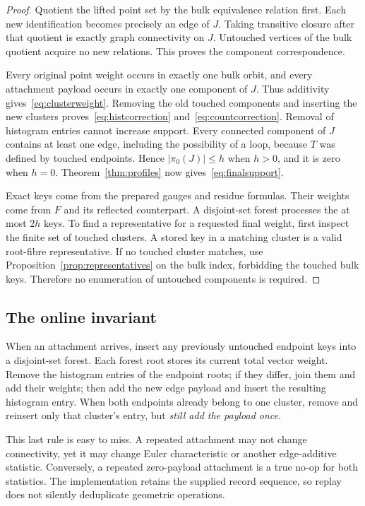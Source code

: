 \documentclass[11pt]{article}
\theoremstyle{definition}
\begin{document}
\begin{proof}
Quotient the lifted point set by the bulk equivalence relation first. Each new identification becomes precisely an edge of $J$. Taking transitive closure after that quotient is exactly graph connectivity on $J$. Untouched vertices of the bulk quotient acquire no new relations. This proves the component correspondence.

Every original point weight occurs in exactly one bulk orbit, and every attachment payload occurs in exactly one component of $J$. Thus additivity gives~\eqref{eq:clusterweight}. Removing the old touched components and inserting the new clusters proves~\eqref{eq:histcorrection} and~\eqref{eq:countcorrection}. Removal of histogram entries cannot increase support. Every connected component of $J$ contains at least one edge, including the possibility of a loop, because $T$ was defined by touched endpoints. Hence $|\pi_0(J)|\le h$ when $h>0$, and it is zero when $h=0$. Theorem~\ref{thm:profiles} now gives~\eqref{eq:finalsupport}.

Exact keys come from the prepared gauges and residue formulas. Their weights come from $F$ and its reflected counterpart. A disjoint-set forest processes the at most $2h$ keys. To find a representative for a requested final weight, first inspect the finite set of touched clusters. A stored key in a matching cluster is a valid root-fibre representative. If no touched cluster matches, use Proposition~\ref{prop:representatives} on the bulk index, forbidding the touched bulk keys. Therefore no enumeration of untouched components is required.
\end{proof}

\subsection{The online invariant}
When an attachment arrives, insert any previously untouched endpoint keys into a disjoint-set forest. Each forest root stores its current total vector weight. Remove the histogram entries of the endpoint roots; if they differ, join them and add their weights; then add the new edge payload and insert the resulting histogram entry. When both endpoints already belong to one cluster, remove and reinsert only that cluster's entry, but \emph{still add the payload once}.

This last rule is easy to miss. A repeated attachment may not change connectivity, yet it may change Euler characteristic or another edge-additive statistic. Conversely, a repeated zero-payload attachment is a true no-op for both statistics. The implementation retains the supplied record sequence, so replay does not silently deduplicate geometric operations.
\end{document}
